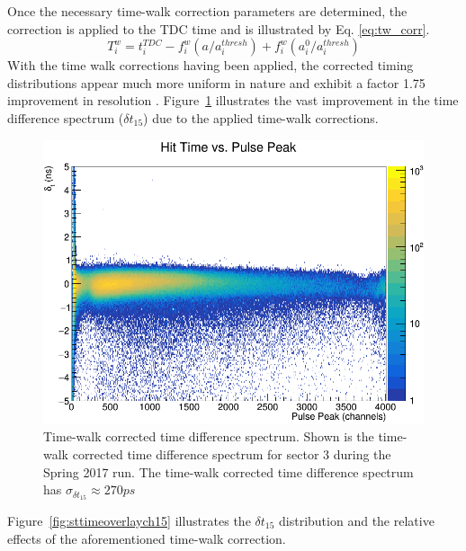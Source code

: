 Once the necessary time-walk correction parameters are determined, the correction is applied to the TDC time and is illustrated by Eq. \ref{eq:tw_corr}.
	\begin{equation} \label{eq:tw_corr}
		T^{w}_{i} = t^{TDC}_{i} - f^{w}_{i}(a/a^{thresh}_{i}) + f^{w}_{i}(a^{0}_{i}/a^{thresh}_{i})
	\end{equation}
With the time walk corrections having been applied, the corrected timing distributions appear much more uniform in nature and exhibit a factor 1.75 improvement in resolution \cite{pooser16}.  Figure~\ref{fig:twdistcorrch15} illustrates the vast improvement in the time difference spectrum ($\delta t_{15}$) due to the applied time-walk corrections.
	\begin{figure}[!htb]
		\centering
		\includegraphics[width=1.0\columnwidth]{calibration/figs/tw_dist_corr_ch15}
		\caption{Time-walk corrected time difference spectrum.  Shown is the time-walk corrected time difference spectrum for sector 3 during the Spring 2017 run. The time-walk corrected time difference spectrum has $\sigma_{\delta t_{15}} \approx 270 ps$}
		\label{fig:twdistcorrch15}
	\end{figure}
Figure~\ref{fig:sttimeoverlaych15} illustrates the $\delta t_{15}$ distribution and the relative effects of the aforementioned time-walk correction.
